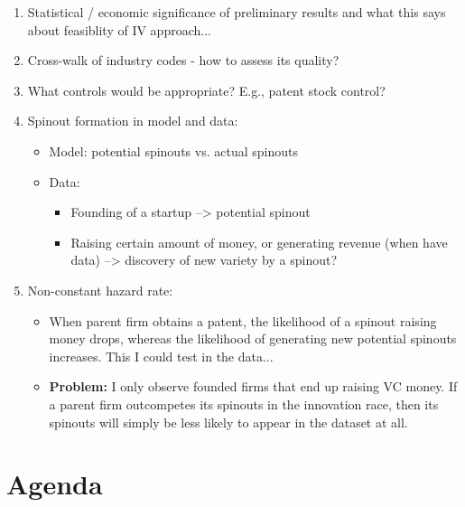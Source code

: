 \documentclass[12pt,english]{article}
\theoremstyle{remark}
\begin{document}
\begin{enumerate}
	\item Statistical / economic significance of preliminary results and what this says about feasiblity of IV approach...
	\item Cross-walk of industry codes - how to assess its quality?
	\item What controls would be appropriate? E.g., patent stock control? 
	\item Spinout formation in model and data:
	\begin{itemize}
		\item Model: potential spinouts vs. actual spinouts
		\item Data:
		\begin{itemize}
			\item Founding of a startup --> potential spinout
			\item Raising certain amount of money, or generating revenue (when have data) --> discovery of new variety by a spinout?
		\end{itemize}
	\end{itemize}
	\item Non-constant hazard rate:
	\begin{itemize}
		\item When parent firm obtains a patent, the likelihood of a spinout raising money drops, whereas the likelihood of generating new potential spinouts increases. This I could test in the data...
		\item \textbf{Problem:} I only observe founded firms that end up raising VC money. If a parent firm outcompetes its spinouts in the innovation race, then its spinouts will simply be less likely to appear in the dataset at all.  
	\end{itemize}
\end{enumerate}

\section*{Agenda}
\end{document}
